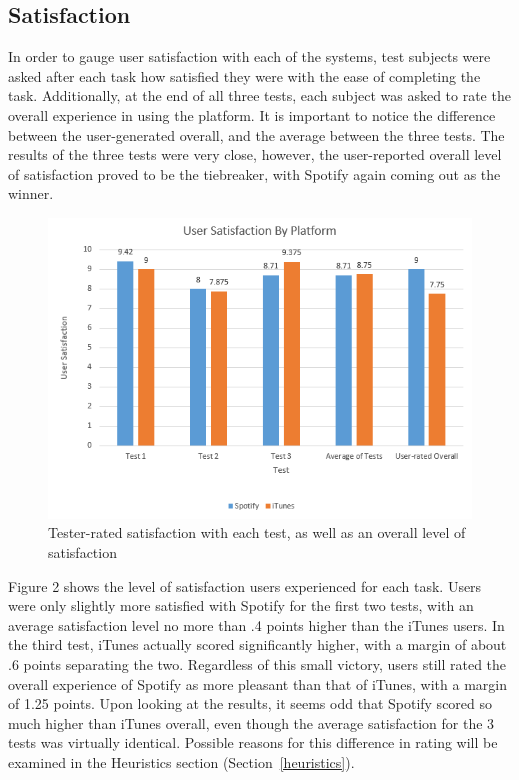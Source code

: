 \documentclass[12pt]{article}
\begin{document}
\subsection{Satisfaction}

In order to gauge user satisfaction with each of the systems, test 
subjects were asked after each task how satisfied they were with 
the ease of completing the task. Additionally, at the end of all 
three tests, each subject was asked to rate the overall experience 
in using the platform. It is important to notice the difference 
between the user-generated overall, and the average between the 
three tests. The results of the three tests were very close, 
however, the user-reported overall level of satisfaction proved to 
be the tiebreaker, with Spotify again coming out as the winner.

\begin{figure}[H]
	\centering
	\includegraphics[width=.75\textwidth]{chart2.png}
	\caption{Tester-rated satisfaction with each test, as well 
as an overall level of satisfaction}
\end{figure}

Figure 2 shows the level of satisfaction users experienced for 
each task. Users were only slightly more satisfied with Spotify 
for the first two tests, with an average satisfaction level no 
more than .4 points higher than the iTunes users. In the third 
test, iTunes actually scored significantly higher, with a margin 
of about .6 points separating the two. Regardless of this small 
victory, users still rated the overall experience of Spotify as 
more pleasant than that of iTunes, with a margin of 1.25 points. 
Upon looking at the results, it seems odd that Spotify scored so 
much higher than iTunes overall, even though the average 
satisfaction for the 3 tests was virtually identical. Possible 
reasons for this difference in rating will be examined in the 
Heuristics section (Section~\ref{heuristics}).
\end{document}
